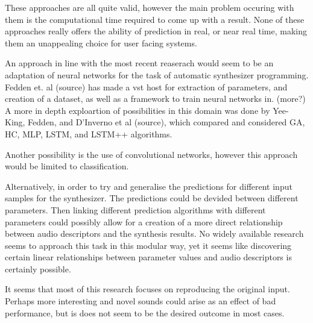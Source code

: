 These approaches are all quite valid, however the main problem
occuring with them is the computational time required to come up with
a result. None of these approaches really offers the ability of
prediction in real, or near real time, making them an unappealing
choice for user facing systems.

An approach in line with the most recent reaserach would seem to be an
adaptation of neural networks for the task of automatic synthesizer
programming. Fedden et. al (source) has made a vst host for extraction
of parameters, and creation of a dataset, as well as a framework to
train neural networks in. (more?) A more in depth exploartion of
possibilities in this domain was done by Yee-King, Fedden, and
D'Inverno et al (source), which compared and considered GA, HC, MLP,
LSTM, and LSTM++ algorithms.

Another possibility is the use of convolutional networks, however this
approach would be limited to classification.

Alternatively, in order to try and generalise the predictions for
different input samples for the synthesizer. The predictions could be
devided between different parameters. Then linking different
prediction algorithms with different parameters could possibly allow
for a creation of a more direct relationship between audio descriptors
and the synthesis results. No widely available research seems to
approach this task in this modular way, yet it seems like discovering
certain linear relationships between parameter values and audio
descriptors is certainly possible.

It seems that most of this research focuses on reproducing the
original input\cite{tatar_automatic_2016}. Perhaps more interesting
and novel sounds could arise as an effect of bad performance, but is
does not seem to be the desired outcome in most cases.






